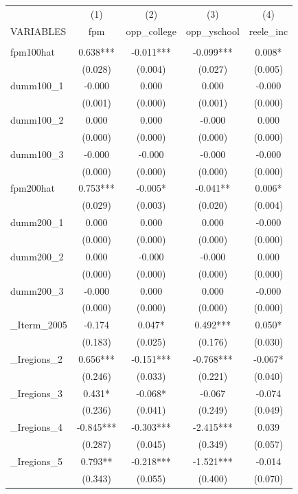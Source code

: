 \documentclass[]{article}
\begin{document}
\begin{tabular}{lcccc} \hline
 & (1) & (2) & (3) & (4) \\
VARIABLES & fpm & opp\_college & opp\_yschool & reele\_inc \\ \hline
 &  &  &  &  \\
fpm100hat & 0.638*** & -0.011*** & -0.099*** & 0.008* \\
 & (0.028) & (0.004) & (0.027) & (0.005) \\
dumm100\_1 & -0.000 & 0.000 & 0.000 & -0.000 \\
 & (0.001) & (0.000) & (0.001) & (0.000) \\
dumm100\_2 & 0.000 & 0.000 & -0.000 & 0.000 \\
 & (0.000) & (0.000) & (0.000) & (0.000) \\
dumm100\_3 & -0.000 & -0.000 & -0.000 & -0.000 \\
 & (0.000) & (0.000) & (0.000) & (0.000) \\
fpm200hat & 0.753*** & -0.005* & -0.041** & 0.006* \\
 & (0.029) & (0.003) & (0.020) & (0.004) \\
dumm200\_1 & 0.000 & 0.000 & 0.000 & -0.000 \\
 & (0.000) & (0.000) & (0.000) & (0.000) \\
dumm200\_2 & 0.000 & -0.000 & -0.000 & 0.000 \\
 & (0.000) & (0.000) & (0.000) & (0.000) \\
dumm200\_3 & -0.000 & 0.000 & 0.000 & -0.000 \\
 & (0.000) & (0.000) & (0.000) & (0.000) \\
\_Iterm\_2005 & -0.174 & 0.047* & 0.492*** & 0.050* \\
 & (0.183) & (0.025) & (0.176) & (0.030) \\
\_Iregions\_2 & 0.656*** & -0.151*** & -0.768*** & -0.067* \\
 & (0.246) & (0.033) & (0.221) & (0.040) \\
\_Iregions\_3 & 0.431* & -0.068* & -0.067 & -0.074 \\
 & (0.236) & (0.041) & (0.249) & (0.049) \\
\_Iregions\_4 & -0.845*** & -0.303*** & -2.415*** & 0.039 \\
 & (0.287) & (0.045) & (0.349) & (0.057) \\
\_Iregions\_5 & 0.793** & -0.218*** & -1.521*** & -0.014 \\
 & (0.343) & (0.055) & (0.400) & (0.070) \\

\end{tabular}
\end{document}
